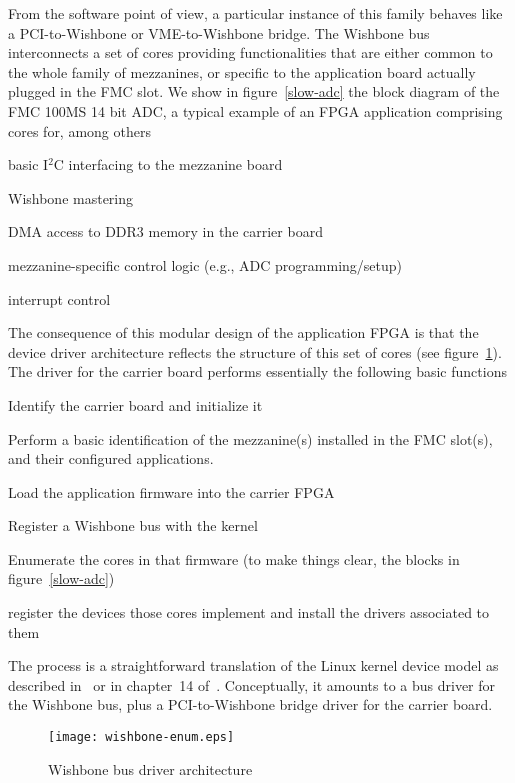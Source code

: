 \documentclass{JAC2003}
\begin{document}
From the software
point of view, a particular instance of this family behaves like a
PCI-to-Wishbone or VME-to-Wishbone bridge. The Wishbone bus
interconnects a set of cores providing functionalities that are either
common to the whole family of mezzanines, or specific to the application
board actually plugged in the FMC slot. We show in figure~\ref{slow-adc}
the block diagram of the FMC 100MS 14 bit ADC,
a typical example of an FPGA application comprising cores for, among
others
\begin{Itemize}
\item basic I${}^2$C interfacing to the mezzanine board
\item Wishbone mastering
\item DMA access to DDR3 memory in the carrier board
\item mezzanine-specific control logic (e.g., ADC programming/setup)
\item interrupt control
\end{Itemize}
The consequence of this modular design of the application FPGA is that
the device driver architecture reflects the structure of this set of
cores (see figure~\ref{wishbone-enum}). The driver for the carrier board
performs essentially the following basic functions
\begin{Itemize}
\item Identify the carrier board and initialize it
\item Perform a basic identification of the mezzanine(s) installed in
    the FMC slot(s), and their configured applications.
\item Load the application firmware into the carrier FPGA
\item Register a Wishbone bus with the kernel
\item Enumerate the cores in that firmware (to make things clear, the
    blocks in figure~\ref{slow-adc})
\item register the devices those cores implement and install the drivers 
    associated to them
\end{Itemize}
The process is a straightforward translation of the Linux kernel device
model as described in~\cite{device-model} or in chapter~14
of~\cite{rubini}. Conceptually, it amounts to a bus driver for the
Wishbone bus, plus a PCI-to-Wishbone bridge driver for the carrier
board.
\begin{figure}[tb]
   \centering
   \texttt{[image: wishbone-enum.eps]}
   \caption{Wishbone bus driver architecture}
   \label{wishbone-enum}
\end{figure}
\end{document}
